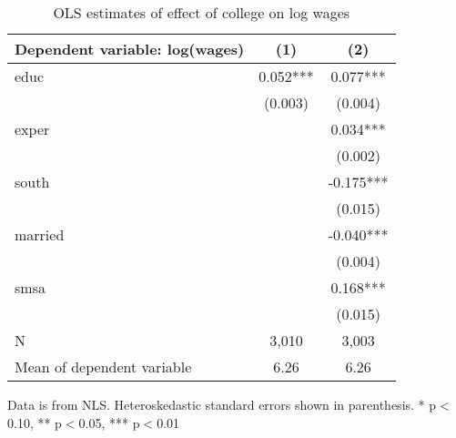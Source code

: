 \begin{table}[htbp]\centering
\small
\caption{OLS estimates of effect of college on log wages}
\begin{center}
\begin{threeparttable}
\begin{tabular}{l*{2}{c}}
\toprule
\multicolumn{1}{l}{\textbf{Dependent variable: log(wages)}}&
\multicolumn{1}{c}{\textbf{(1)}}&
\multicolumn{1}{c}{\textbf{(2)}}\\
\midrule
educ                &       0.052***&       0.077***\\
                    &     (0.003)   &     (0.004)   \\
exper               &               &       0.034***\\
                    &               &     (0.002)   \\
south               &               &      -0.175***\\
                    &               &     (0.015)   \\
married             &               &      -0.040***\\
                    &               &     (0.004)   \\
smsa                &               &       0.168***\\
                    &               &     (0.015)   \\
\midrule
N                   &       3,010   &       3,003   \\
Mean of dependent variable&        6.26   &        6.26   \\
\bottomrule
\end{tabular}
\begin{tablenotes}
\tiny
\item Data is from NLS.  Heteroskedastic standard errors shown in parenthesis.  * p$<$0.10, ** p$<$0.05, *** p$<$0.01
\end{tablenotes}
\end{threeparttable}
\end{center}
\end{table}
